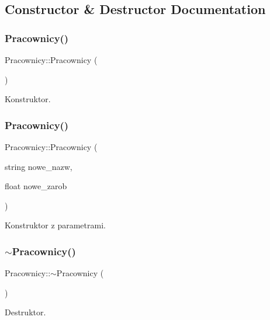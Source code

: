 \subsection{Constructor \& Destructor Documentation}
\mbox{\label{class_pracownicy_a4b6c44961abc642567c50d14ccededd8}} 
\subsubsection{Pracownicy()\hspace{0.1cm}{\footnotesize\ttfamily [1/2]}}
{\footnotesize\ttfamily Pracownicy\+::\+Pracownicy (\begin{DoxyParamCaption}{ }\end{DoxyParamCaption})}



Konstruktor. 

\mbox{\label{class_pracownicy_a274fe5e34de172af59b55f02bc9feead}} 
\subsubsection{Pracownicy()\hspace{0.1cm}{\footnotesize\ttfamily [2/2]}}
{\footnotesize\ttfamily Pracownicy\+::\+Pracownicy (\begin{DoxyParamCaption}\item[{string}]{nowe\+\_\+nazw,  }\item[{float}]{nowe\+\_\+zarob }\end{DoxyParamCaption})}



Konstruktor z parametrami. 

\mbox{\label{class_pracownicy_a712918bfaf884baaadaf5eca3aa131c1}} 
\subsubsection{$\sim$\+Pracownicy()}
{\footnotesize\ttfamily Pracownicy\+::$\sim$\+Pracownicy (\begin{DoxyParamCaption}{ }\end{DoxyParamCaption})}



Destruktor. 



